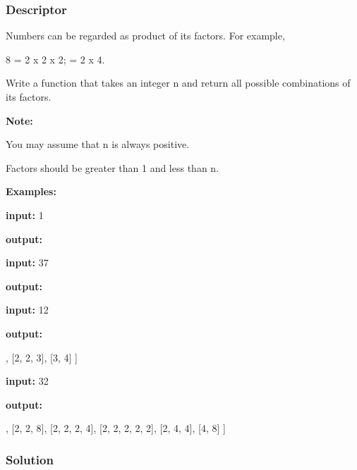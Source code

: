 \subsubsection{Descriptor}
Numbers can be regarded as product of its factors. For example,
\begin{Code}
8 = 2 x 2 x 2;
  = 2 x 4.
\end{Code}
Write a function that takes an integer n and return all possible combinations of its factors.

\textbf{Note:}

You may assume that n is always positive.

Factors should be greater than 1 and less than n.

\textbf{Examples:}

\textbf{input:} 1

\textbf{output:} \code{[]}

\textbf{input:} 37

\textbf{output:} \code{[]}

\textbf{input:} 12

\textbf{output:}

\begin{Code}
[
  [2, 6],
  [2, 2, 3],
  [3, 4]
]
\end{Code}

\textbf{input:} 32

\textbf{output:}

\begin{Code}
[
  [2, 16],
  [2, 2, 8],
  [2, 2, 2, 4],
  [2, 2, 2, 2, 2],
  [2, 4, 4],
  [4, 8]
]
\end{Code}

\newpage

\subsubsection{Solution}

